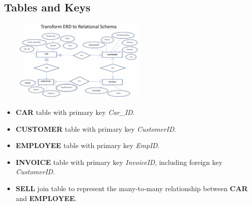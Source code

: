 \vspace{-0.3cm}
\subsection*{Tables and Keys}
\vspace{-0.1cm}

\begin{center}
\includegraphics[width=8cm,height=4cm]{logical_model/entity_relation_img}
\end{center}

\vspace{-0.1cm}

\begin{itemize}[noitemsep,leftmargin=*]
\leftskip-\dimexpr\leftmargin %
    \item[] \textbf{CAR} table with primary key \textit{Car\_ID}.
    \item[] \textbf{CUSTOMER} table with primary key \textit{CustomerID}.
    \item[] \textbf{EMPLOYEE} table with primary key \textit{EmpID}.
    \item[] \textbf{INVOICE} table with primary key \textit{InvoiceID}, including foreign key \textit{CustomerID}.
    \item[] \textbf{SELL} join table to represent the many-to-many relationship between \textbf{CAR} and \textbf{EMPLOYEE}.
\end{itemize}


